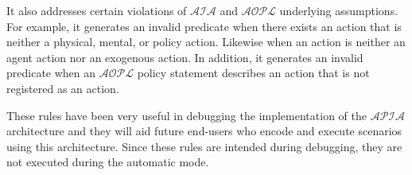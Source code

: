 It also addresses certain violations of $\mathcal{AIA}$ and $\mathcal{AOPL}$ underlying assumptions.
For example, it generates an invalid predicate when there exists an action that is neither a physical, mental, or policy action.
Likewise when an action is neither an agent action nor an exogenous action.
In addition, it generates an invalid predicate when an $\mathcal{AOPL}$ policy statement describes an action that is not registered as an action.

These rules have been very useful in debugging the implementation of the $\mathcal{APIA}$ architecture and they will aid future end-users who encode and execute scenarios using this architecture.
Since these rules are intended during debugging, they are not executed during the automatic mode.
